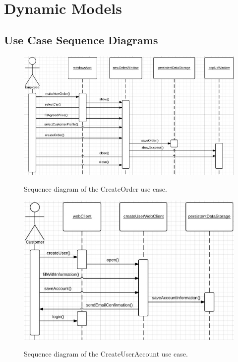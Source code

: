 \section{Dynamic Models}

\subsection{Use Case Sequence Diagrams}
\begin{figure}[H]
	\centering
		\includegraphics[width=\textwidth]{Figures/SequenceDiagram-CreateOrder}\\
	\caption{Sequence diagram of the CreateOrder use case.}
  \label{fig:SequenceDiagram-CreateOrder}
\end{figure}
\begin{figure}[H]
	\centering
		\includegraphics[width=\textwidth]{Figures/SequenceDiagram-CreateUserAccount}\\
	\caption{Sequence diagram of the CreateUserAccount use case.}
  \label{fig:SequenceDiagram-CreateUserAccount}
\end{figure}
